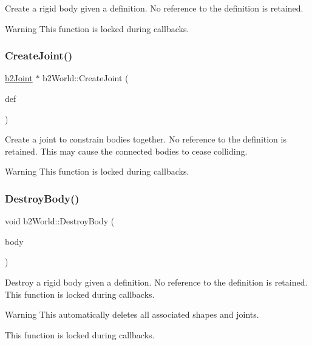 Create a rigid body given a definition. No reference to the definition is retained. \begin{DoxyWarning}{Warning}
This function is locked during callbacks. 
\end{DoxyWarning}
\mbox{\label{classb2_world_a5cba9d0653149eb62504154e6fb35021}} 
\subsubsection{\texorpdfstring{CreateJoint()}{CreateJoint()}}
{\footnotesize\ttfamily \mbox{\hyperlink{classb2_joint}{b2\+Joint}} $\ast$ b2\+World\+::\+Create\+Joint (\begin{DoxyParamCaption}\item[{const \mbox{\hyperlink{structb2_joint_def}{b2\+Joint\+Def}} $\ast$}]{def }\end{DoxyParamCaption})}

Create a joint to constrain bodies together. No reference to the definition is retained. This may cause the connected bodies to cease colliding. \begin{DoxyWarning}{Warning}
This function is locked during callbacks. 
\end{DoxyWarning}
\mbox{\label{classb2_world_ad52231ad7a9556ef5735ac79cbcd8fcf}} 
\subsubsection{\texorpdfstring{DestroyBody()}{DestroyBody()}}
{\footnotesize\ttfamily void b2\+World\+::\+Destroy\+Body (\begin{DoxyParamCaption}\item[{\mbox{\hyperlink{classb2_body}{b2\+Body}} $\ast$}]{body }\end{DoxyParamCaption})}

Destroy a rigid body given a definition. No reference to the definition is retained. This function is locked during callbacks. \begin{DoxyWarning}{Warning}
This automatically deletes all associated shapes and joints. 

This function is locked during callbacks. 
\end{DoxyWarning}
\mbox{\label{classb2_world_add5942aef171e54cfa384c8975746dca}} 
